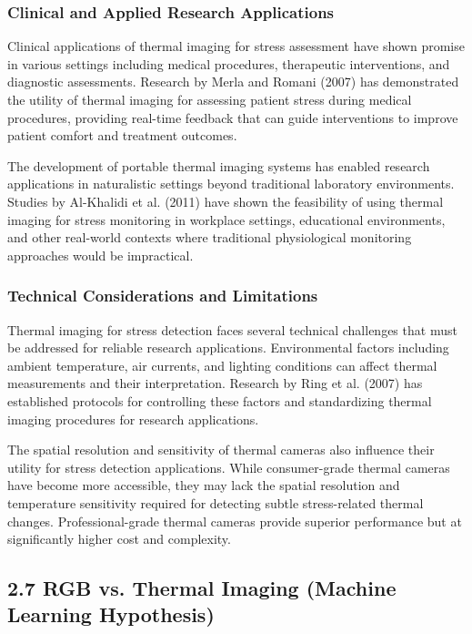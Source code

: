 \documentclass[12pt,a4paper]{article}
\begin{document}
\subsubsection{Clinical and Applied Research Applications}

Clinical applications of thermal imaging for stress assessment have shown promise in various settings including medical
procedures, therapeutic interventions, and diagnostic assessments. Research by Merla and Romani (2007) has demonstrated
the utility of thermal imaging for assessing patient stress during medical procedures, providing real-time feedback that
can guide interventions to improve patient comfort and treatment outcomes.

The development of portable thermal imaging systems has enabled research applications in naturalistic settings beyond
traditional laboratory environments. Studies by Al-Khalidi et al. (2011) have shown the feasibility of using thermal
imaging for stress monitoring in workplace settings, educational environments, and other real-world contexts where
traditional physiological monitoring approaches would be impractical.

\subsubsection{Technical Considerations and Limitations}

Thermal imaging for stress detection faces several technical challenges that must be addressed for reliable research
applications. Environmental factors including ambient temperature, air currents, and lighting conditions can affect
thermal measurements and their interpretation. Research by Ring et al. (2007) has established protocols for controlling
these factors and standardizing thermal imaging procedures for research applications.

The spatial resolution and sensitivity of thermal cameras also influence their utility for stress detection
applications. While consumer-grade thermal cameras have become more accessible, they may lack the spatial resolution and
temperature sensitivity required for detecting subtle stress-related thermal changes. Professional-grade thermal cameras
provide superior performance but at significantly higher cost and complexity.

\subsection{2.7 RGB vs. Thermal Imaging (Machine Learning Hypothesis)}
\end{document}
